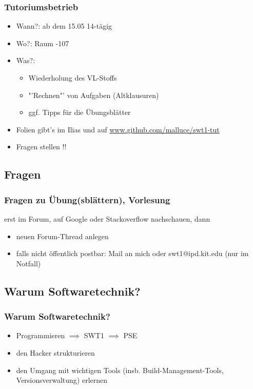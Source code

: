 \documentclass[18pt]{beamer}
\begin{document}
		\begin{frame}
			\frametitle{Tutoriumsbetrieb}
			\begin{itemize}
				\item Wann?: ab dem 15.05 14-tägig 
				\item Wo?: Raum -107
				\item Was?: 
					\begin{itemize}
						\item Wiederholung des VL-Stoffs
						\item "'Rechnen"' von Aufgaben (Altklausuren)
						\item ggf. Tipps für die Übungsblätter
					\end{itemize}
				\item Folien gibt's im Ilias und auf \url{www.github.com/malluce/swt1-tut}
				\item Fragen stellen !!
			\end{itemize}
		\end{frame}
		
	\subsection{Fragen}
		\begin{frame}
			\frametitle{Fragen zu Übung(sblättern), Vorlesung}
			erst im Forum, auf Google oder Stackoverflow nachschauen, dann
				\begin{itemize}
					\item neuen Forum-Thread anlegen
					\item falls nicht öffentlich postbar: Mail an mich oder swt1@ipd.kit.edu (nur im Notfall)
				\end{itemize}
		\end{frame}
		
	\subsection{Warum Softwaretechnik?}
		\begin{frame}
			\frametitle{Warum Softwaretechnik?}
			\begin{itemize}
				\item Programmieren $\implies$ SWT1 $\implies$ PSE
				\item den Hacker strukturieren 
				\item den Umgang mit wichtigen Tools (insb. Build-Management-Tools, Versionsverwaltung) erlernen
			\end{itemize}
		\end{frame}
		
\end{document}
